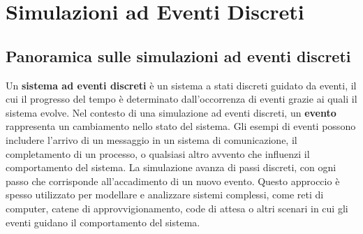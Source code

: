 \documentclass[12pt,a4paper,openright,twoside]{book}
\begin{document}
\chapter{Simulazioni ad Eventi Discreti}
\section{Panoramica sulle simulazioni ad eventi discreti}
\label{sec:panoramica-des}
Un \textbf{sistema ad eventi discreti} è un sistema a stati discreti guidato da eventi, il cui il progresso del tempo è determinato dall'occorrenza di eventi grazie ai quali il sistema evolve. Nel contesto di una simulazione ad eventi discreti, un \textbf{evento} rappresenta un cambiamento nello stato del sistema. 
Gli esempi di eventi possono includere l'arrivo di un messaggio in un sistema di comunicazione, il completamento di un processo, o qualsiasi altro avvento che influenzi il comportamento del sistema. La simulazione avanza di passi discreti, con ogni passo che corrisponde all'accadimento di un nuovo evento. 
Questo approccio è spesso utilizzato per modellare e analizzare sistemi complessi, come reti di computer, catene di approvvigionamento, code di attesa o altri scenari in cui gli eventi guidano il comportamento del sistema. 
\end{document}
